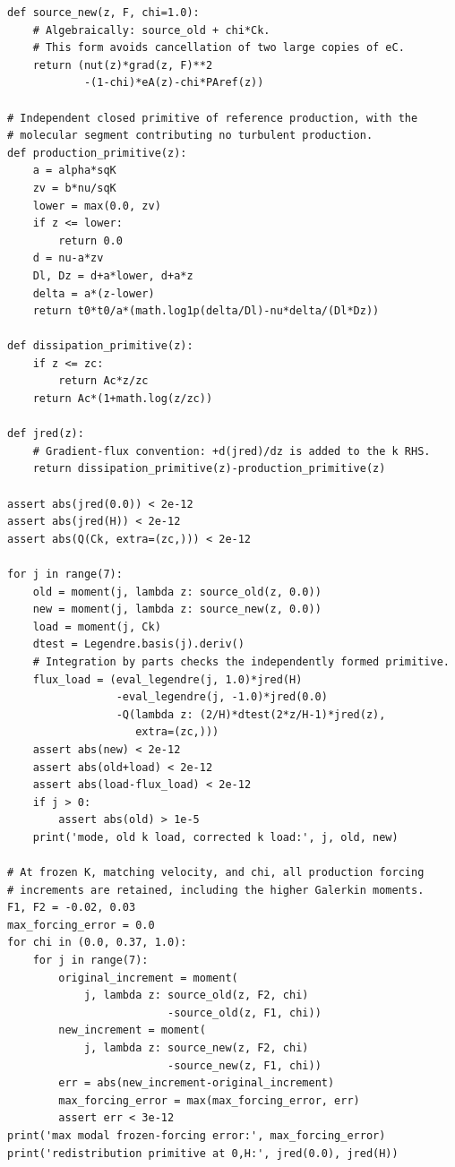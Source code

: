 \documentclass[11pt,a4paper]{article}
\numberwithin{equation}{section}
\begin{document}
\begin{lstlisting}[style=py]
def source_new(z, F, chi=1.0):
    # Algebraically: source_old + chi*Ck.
    # This form avoids cancellation of two large copies of eC.
    return (nut(z)*grad(z, F)**2
            -(1-chi)*eA(z)-chi*PAref(z))

# Independent closed primitive of reference production, with the
# molecular segment contributing no turbulent production.
def production_primitive(z):
    a = alpha*sqK
    zv = b*nu/sqK
    lower = max(0.0, zv)
    if z <= lower:
        return 0.0
    d = nu-a*zv
    Dl, Dz = d+a*lower, d+a*z
    delta = a*(z-lower)
    return t0*t0/a*(math.log1p(delta/Dl)-nu*delta/(Dl*Dz))

def dissipation_primitive(z):
    if z <= zc:
        return Ac*z/zc
    return Ac*(1+math.log(z/zc))

def jred(z):
    # Gradient-flux convention: +d(jred)/dz is added to the k RHS.
    return dissipation_primitive(z)-production_primitive(z)

assert abs(jred(0.0)) < 2e-12
assert abs(jred(H)) < 2e-12
assert abs(Q(Ck, extra=(zc,))) < 2e-12

for j in range(7):
    old = moment(j, lambda z: source_old(z, 0.0))
    new = moment(j, lambda z: source_new(z, 0.0))
    load = moment(j, Ck)
    dtest = Legendre.basis(j).deriv()
    # Integration by parts checks the independently formed primitive.
    flux_load = (eval_legendre(j, 1.0)*jred(H)
                 -eval_legendre(j, -1.0)*jred(0.0)
                 -Q(lambda z: (2/H)*dtest(2*z/H-1)*jred(z),
                    extra=(zc,)))
    assert abs(new) < 2e-12
    assert abs(old+load) < 2e-12
    assert abs(load-flux_load) < 2e-12
    if j > 0:
        assert abs(old) > 1e-5
    print('mode, old k load, corrected k load:', j, old, new)

# At frozen K, matching velocity, and chi, all production forcing
# increments are retained, including the higher Galerkin moments.
F1, F2 = -0.02, 0.03
max_forcing_error = 0.0
for chi in (0.0, 0.37, 1.0):
    for j in range(7):
        original_increment = moment(
            j, lambda z: source_old(z, F2, chi)
                         -source_old(z, F1, chi))
        new_increment = moment(
            j, lambda z: source_new(z, F2, chi)
                         -source_new(z, F1, chi))
        err = abs(new_increment-original_increment)
        max_forcing_error = max(max_forcing_error, err)
        assert err < 3e-12
print('max modal frozen-forcing error:', max_forcing_error)
print('redistribution primitive at 0,H:', jred(0.0), jred(H))


\end{lstlisting}
\end{document}
